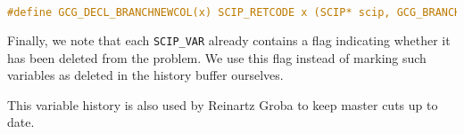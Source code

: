 \begin{lstlisting}[language=C, caption=Branching Rule Interface Extension]
#define GCG_DECL_BRANCHNEWCOL(x) SCIP_RETCODE x (SCIP* scip, GCG_BRANCHDATA* branchdata, SCIP_VAR* mastervar)
\end{lstlisting}

Finally, we note that each \texttt{SCIP\_VAR} already contains a flag indicating whether it has been deleted from the problem. We use this flag instead of marking such variables as deleted in the history buffer ourselves.

This variable history is also used by Reinartz Groba \cite{reinartzgroba2024todo} to keep master cuts up to date.
